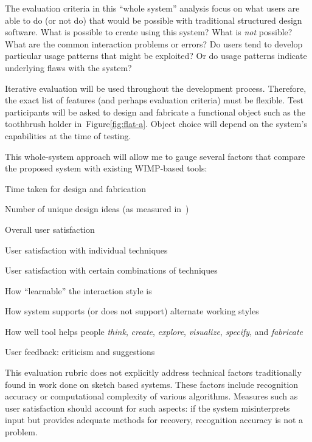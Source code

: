 \documentclass[11pt]{article}
\newenvironment{packed_enum}{
\begin{enumerate}
  \setlength{\itemsep}{1pt}
  \setlength{\parskip}{0pt}
  \setlength{\parsep}{0pt}
}{\end{enumerate}}
\begin{document}
The evaluation criteria in this ``whole system'' analysis focus on
what users are able to do (or not do) that would be possible with
traditional structured design software. What is possible to create
using this system? What is \textit{not} possible? What are the common
interaction problems or errors? Do users tend to develop particular
usage patterns that might be exploited? Or do usage patterns indicate
underlying flaws with the system?

Iterative evaluation will be used throughout the development
process. Therefore, the exact list of features (and perhaps evaluation
criteria) must be flexible. Test participants will be asked to design
and fabricate a functional object such as the toothbrush holder
in~Figure\ref{fig:flat-a}. Object choice will depend on the system's
capabilities at the time of testing.

This whole-system approach will allow me to gauge several factors that
compare the proposed system with existing WIMP-based tools:

\begin{packed_enum}
\item Time taken for design and fabrication
\item Number of unique design ideas (as measured
  in~\cite{goel-sketches-of-thought})
\item Overall user satisfaction
\item User satisfaction with individual techniques
\item User satisfaction with certain combinations of techniques
\item How ``learnable'' the interaction style is
\item How system supports (or does not support) alternate working
  styles
\item How well tool helps people \textit{think}, \textit{create},
  \textit{explore}, \textit{visualize}, \textit{specify}, and
  \textit{fabricate}
\item User feedback: criticism and suggestions
\end{packed_enum}

This evaluation rubric does not explicitly address technical factors
traditionally found in work done on sketch based systems. These
factors include recognition accuracy or computational complexity of
various algorithms. Measures such as user satisfaction should account
for such aspects: if the system misinterprets input but provides
adequate methods for recovery, recognition accuracy is not a problem.
\end{document}
